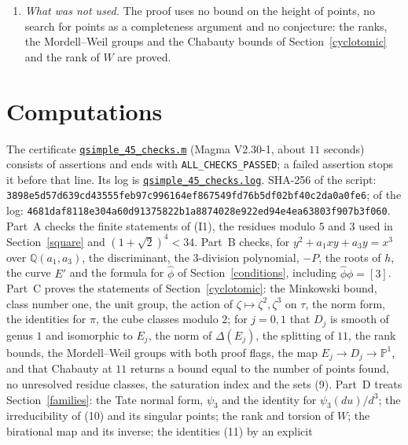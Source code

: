 \documentclass[11pt]{article}
\newcommand{\Q}{\mathbb Q}
\begin{document}
\begin{enumerate}
\item\label{rem-rerun} \emph{What was not used.} The proof uses no bound on the height of points, no
search for points as a completeness argument and no conjecture: the ranks, the Mordell--Weil groups
and the Chabauty bounds of Section~\ref{cyclotomic} and the rank of \(W\) are proved.
\end{enumerate}

\section{Computations}\label{computations}

The certificate
\href{https://genus-2-torsion.github.io/data/knowledge/sources/qsimple_45_checks.m}{\texttt{qsimple\_45\_checks.m}}
(Magma V2.30-1, about \(11\) seconds) consists of assertions and ends with
\texttt{ALL\_CHECKS\_PASSED}; a failed assertion stops it before that line. Its log is
\href{https://genus-2-torsion.github.io/data/knowledge/sources/qsimple_45_checks.log}{\texttt{qsimple\_45\_checks.log}}.
SHA-256 of the script:
\texttt{3898e5d57d639cd4\allowbreak 3555feb97c996164\allowbreak ef867549fd76b5df\allowbreak 02bf40c2da0a0fe6};
of the log:
\texttt{4681daf8118e304a\allowbreak 60d91375822b1a88\allowbreak 74028e922ed94e4e\allowbreak a63803f907b3f060}.
Part~A checks the finite statements of (I1), the residues modulo \(5\) and \(3\) used in
Section~\ref{square} and \((1+\sqrt2)^4<34\). Part~B checks, for \(y^2+a_1xy+a_3y=x^3\) over
\(\Q(a_1,a_3)\), the discriminant, the \(3\)-division polynomial, \(-P\), the roots of \(h\), the curve
\(E'\) and the formula for \(\hat\phi\) of Section~\ref{conditions}, including \(\hat\phi\phi=[3]\).
Part~C proves the statements of Section~\ref{cyclotomic}: the Minkowski bound, class number one, the
unit group, the action of \(\zeta\mapsto\zeta^2,\zeta^3\) on \(\tau\), the norm form, the identities
for \(\pi\), the cube classes modulo \(2\); for \(j=0,1\) that \(D_j\) is smooth of genus \(1\) and
isomorphic to \(E_j\), the norm of \(\Delta(E_j)\), the splitting of \(11\), the rank bounds, the
Mordell--Weil groups with both proof flags, the map \(E_j\to D_j\to\mathbb P^1\), and that Chabauty at
\(11\) returns a bound equal to the number of points found, no unresolved residue classes, the
saturation index and the sets (9). Part~D treats Section~\ref{families}: the Tate normal form,
\(\psi_3\) and the identity for \(\psi_3(du)/d^3\); the irreducibility of (10) and its singular points;
the rank and torsion of \(W\); the birational map and its inverse; the identities (11) by an explicit
\end{document}
